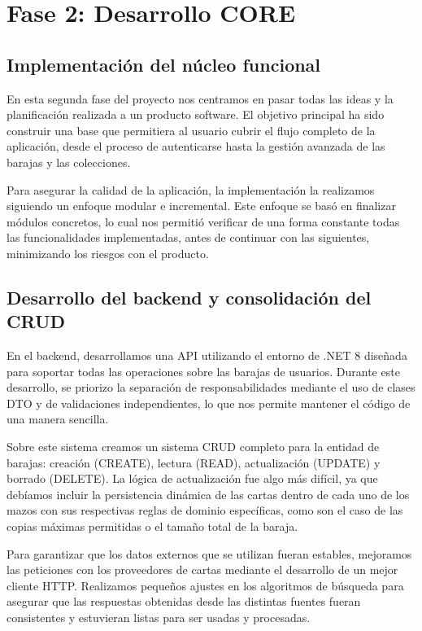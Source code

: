\chapter{Fase 2: Desarrollo CORE}\label{cap:desarrollo}

\section{Implementación del núcleo funcional}

En esta segunda fase del proyecto nos centramos en pasar todas las ideas y la planificación realizada a un producto software. El objetivo principal ha sido construir una base que permitiera al usuario cubrir el flujo completo de la aplicación, desde el proceso de autenticarse hasta la gestión avanzada de las barajas y las colecciones.

Para asegurar la calidad de la aplicación, la implementación la realizamos siguiendo un enfoque modular e incremental. Este enfoque se basó en finalizar módulos concretos, lo cual nos permitió verificar de una forma constante todas las funcionalidades implementadas, antes de continuar con las siguientes, minimizando los riesgos con el producto.

\section{Desarrollo del backend y consolidación del CRUD}

En el backend, desarrollamos una API utilizando el entorno de .NET 8 diseñada para soportar todas las operaciones sobre las barajas de usuarios. Durante este desarrollo, se priorizo la separación de responsabilidades mediante el uso de clases DTO y de validaciones independientes, lo que nos permite mantener el código de una manera sencilla.

Sobre este sistema creamos un sistema CRUD completo para la entidad de barajas: creación (CREATE), lectura (READ), actualización (UPDATE) y borrado (DELETE). La lógica de actualización fue algo más difícil, ya que debíamos incluir la persistencia dinámica de las cartas dentro de cada uno de los mazos con sus respectivas reglas de dominio específicas, como son el caso de  las copias máximas permitidas o el tamaño total de la baraja.

Para garantizar que los datos externos que se utilizan fueran estables, mejoramos las peticiones con los proveedores de cartas mediante el desarrollo de un mejor cliente HTTP. Realizamos pequeños ajustes en los algoritmos de búsqueda para asegurar que las respuestas obtenidas desde las distintas fuentes fueran consistentes y estuvieran listas para ser usadas y procesadas.

